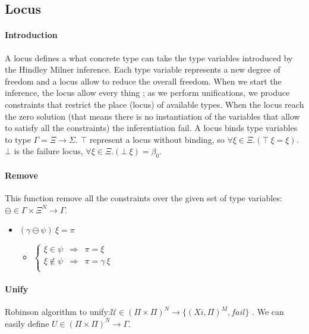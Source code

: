 \documentclass[a4paper]{report}
\begin{document}
\subsection{Locus}

\paragraph{Introduction} A locus defines a what concrete type can take the type variables introduced by the Hindley Milner inference. Each type variable represents a new degree of freedom and a locus allow to reduce the overall freedom. When we start the inference, the locus allow every thing ; as we perform unifications, we produce constraints that restrict the place (locus) of available types. When the locus reach the zero solution (that means there is no instantiation of the variables that allow to satisfy all the constraints) the inferentiation fail. A locus binds type variables to type $\Gamma =\Xi \to \Sigma$. $\top$ represent a locus without binding, so $\forall \xi \in \Xi. (\top\ \xi = \xi)$. $\bot$ is the failure locus, $\forall\xi\in\Xi.(\bot\ \xi) = \beta_0$.

\paragraph{Remove} This function remove all the constraints over the given set of type variables: $\ominus\in\Gamma\times \Xi^N\to\Gamma$.

\begin{itemize}
\item $(\gamma\ominus\psi)\ \xi=\pi$
	\begin{itemize}
	\item $\left\{\begin{array}{ccl}
	\xi\in\psi&\Rightarrow&\pi=\xi\\
	\xi\notin\psi&\Rightarrow&\pi=\gamma\ \xi\\
	\end{array}\right.$
	\end{itemize}
\end{itemize} 

\paragraph{Unify} Robinson algorithm to unify:$\mathcal U \in (\Pi\times\Pi)^N\to\{(Xi,\Pi)^M,fail\}$ \cite{robin}. We can easily define $U\in (\Pi\times\Pi)^N\to\Gamma.$
\end{document}
